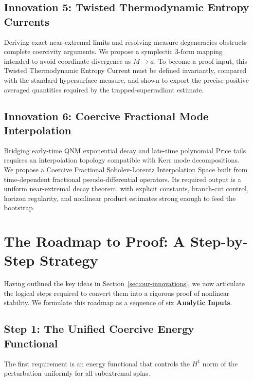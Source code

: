 \documentclass[12pt,a4paper]{article}
\begin{document}
\subsection{Innovation 5: Twisted Thermodynamic Entropy Currents}

Deriving exact near-extremal limits and resolving measure degeneracies obstructs complete coercivity arguments. We propose a symplectic 3-form mapping intended to avoid coordinate divergence as $M \to a$. To become a proof input, this Twisted Thermodynamic Entropy Current must be defined invariantly, compared with the standard hypersurface measure, and shown to export the precise positive averaged quantities required by the trapped-superradiant estimate.

\subsection{Innovation 6: Coercive Fractional Mode Interpolation}

Bridging early-time QNM exponential decay and late-time polynomial Price tails requires an interpolation topology compatible with Kerr mode decompositions. We propose a Coercive Fractional Sobolev-Lorentz Interpolation Space built from time-dependent fractional pseudo-differential operators. Its required output is a uniform near-extremal decay theorem, with explicit constants, branch-cut control, horizon regularity, and nonlinear product estimates strong enough to feed the bootstrap.

\section{The Roadmap to Proof: A Step-by-Step Strategy}

Having outlined the key ideas in Section~\ref{sec:our-innovations}, we now articulate the logical steps required to convert them into a rigorous proof of nonlinear stability. We formulate this roadmap as a sequence of six \textbf{Analytic Inputs}.

\subsection{Step 1: The Unified Coercive Energy Functional}

The first requirement is an energy functional that controls the $H^1$ norm of the perturbation uniformly for all subextremal spins.
\end{document}
